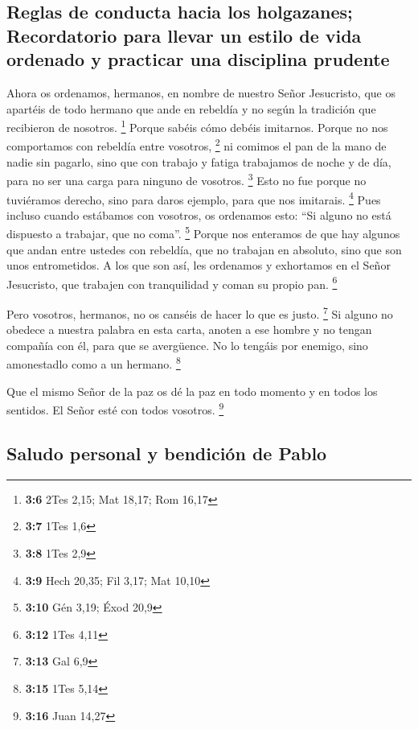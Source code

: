 \begin{paracol}{2}
{\subsection{Reglas de conducta hacia los holgazanes; Recordatorio para
llevar un estilo de vida ordenado y practicar una disciplina
prudente}\label{reglas-de-conducta-hacia-los-holgazanes-recordatorio-para-llevar-un-estilo-de-vida-ordenado-y-practicar-una-disciplina-prudente}}

 Ahora os ordenamos, hermanos, en nombre de nuestro Señor
Jesucristo, que os apartéis de todo hermano que ande en rebeldía y no
según la tradición que recibieron de nosotros. \footnote{\textbf{3:6}
  2Tes 2,15; Mat 18,17; Rom 16,17}  Porque sabéis cómo
debéis imitarnos. Porque no nos comportamos con rebeldía entre vosotros,
\footnote{\textbf{3:7} 1Tes 1,6}  ni comimos el pan de la
mano de nadie sin pagarlo, sino que con trabajo y fatiga trabajamos de
noche y de día, para no ser una carga para ninguno de vosotros.
\footnote{\textbf{3:8} 1Tes 2,9}  Esto no fue porque no
tuviéramos derecho, sino para daros ejemplo, para que nos imitarais.
\footnote{\textbf{3:9} Hech 20,35; Fil 3,17; Mat 10,10} 
Pues incluso cuando estábamos con vosotros, os ordenamos esto: ``Si
alguno no está dispuesto a trabajar, que no coma''. \footnote{\textbf{3:10}
  Gén 3,19; Éxod 20,9}  Porque nos enteramos de que hay
algunos que andan entre ustedes con rebeldía, que no trabajan en
absoluto, sino que son unos entrometidos.  A los que son
así, les ordenamos y exhortamos en el Señor Jesucristo, que trabajen con
tranquilidad y coman su propio pan. \footnote{\textbf{3:12} 1Tes 4,11}

 Pero vosotros, hermanos, no os canséis de hacer lo que
es justo. \footnote{\textbf{3:13} Gal 6,9}  Si alguno no
obedece a nuestra palabra en esta carta, anoten a ese hombre y no tengan
compañía con él, para que se avergüence.  No lo tengáis
por enemigo, sino amonestadlo como a un hermano. \footnote{\textbf{3:15}
  1Tes 5,14}

 Que el mismo Señor de la paz os dé la paz en todo
momento y en todos los sentidos. El Señor esté con todos vosotros.
\footnote{\textbf{3:16} Juan 14,27}

\hypertarget{saludo-personal-y-bendiciuxf3n-de-pablo}{%
\subsection{Saludo personal y bendición de
Pablo}\label{saludo-personal-y-bendiciuxf3n-de-pablo}}


\end{paracol}
